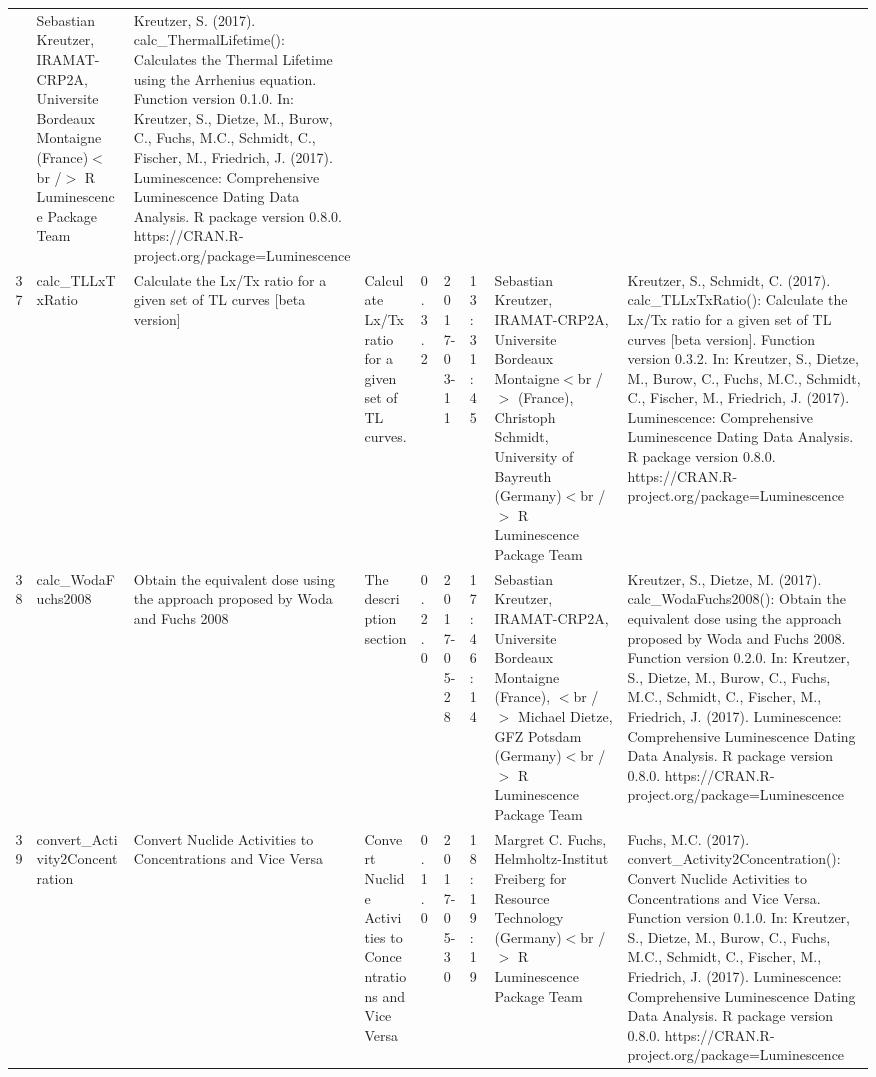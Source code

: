 \begin{table}[ht]
\begin{tabular}{rllllllll}
 & Sebastian Kreutzer, IRAMAT-CRP2A, Universite Bordeaux Montaigne (France)$<$br /$>$  R Luminescence Package Team & Kreutzer, S. (2017). calc\_ThermalLifetime(): Calculates the Thermal Lifetime using the Arrhenius equation. Function version 0.1.0. In: Kreutzer, S., Dietze, M., Burow, C., Fuchs, M.C., Schmidt, C., Fischer, M., Friedrich, J. (2017). Luminescence: Comprehensive Luminescence Dating Data Analysis. R package version 0.8.0. https://CRAN.R-project.org/package=Luminescence
 \\ 
  37 & calc\_TLLxTxRatio & Calculate the Lx/Tx ratio for a given set of TL curves [beta version] & Calculate Lx/Tx ratio for a given set of TL curves. & 0.3.2 & 2017-03-11 & 13:31:45
 & Sebastian Kreutzer, IRAMAT-CRP2A, Universite Bordeaux Montaigne$<$br /$>$ (France), Christoph Schmidt, University of Bayreuth (Germany)$<$br /$>$  R Luminescence Package Team & Kreutzer, S., Schmidt, C. (2017). calc\_TLLxTxRatio(): Calculate the Lx/Tx ratio for a given set of TL curves [beta version]. Function version 0.3.2. In: Kreutzer, S., Dietze, M., Burow, C., Fuchs, M.C., Schmidt, C., Fischer, M., Friedrich, J. (2017). Luminescence: Comprehensive Luminescence Dating Data Analysis. R package version 0.8.0. https://CRAN.R-project.org/package=Luminescence
 \\ 
  38 & calc\_WodaFuchs2008 & Obtain the equivalent dose using the approach proposed by Woda and Fuchs 2008 & The description section & 0.2.0 & 2017-05-28 & 17:46:14
 & Sebastian Kreutzer, IRAMAT-CRP2A, Universite Bordeaux Montaigne (France), $<$br /$>$ Michael Dietze, GFZ Potsdam (Germany)$<$br /$>$  R Luminescence Package Team & Kreutzer, S., Dietze, M. (2017). calc\_WodaFuchs2008(): Obtain the equivalent dose using the approach proposed by Woda and Fuchs 2008. Function version 0.2.0. In: Kreutzer, S., Dietze, M., Burow, C., Fuchs, M.C., Schmidt, C., Fischer, M., Friedrich, J. (2017). Luminescence: Comprehensive Luminescence Dating Data Analysis. R package version 0.8.0. https://CRAN.R-project.org/package=Luminescence
 \\ 
  39 & convert\_Activity2Concentration & Convert Nuclide Activities to Concentrations and Vice Versa & Convert Nuclide Activities to Concentrations and Vice Versa & 0.1.0 & 2017-05-30 & 18:19:19
 & Margret C. Fuchs, Helmholtz-Institut Freiberg for Resource Technology (Germany)$<$br /$>$  R Luminescence Package Team & Fuchs, M.C. (2017). convert\_Activity2Concentration(): Convert Nuclide Activities to Concentrations and Vice Versa. Function version 0.1.0. In: Kreutzer, S., Dietze, M., Burow, C., Fuchs, M.C., Schmidt, C., Fischer, M., Friedrich, J. (2017). Luminescence: Comprehensive Luminescence Dating Data Analysis. R package version 0.8.0. https://CRAN.R-project.org/package=Luminescence

\end{tabular}
\end{table}
